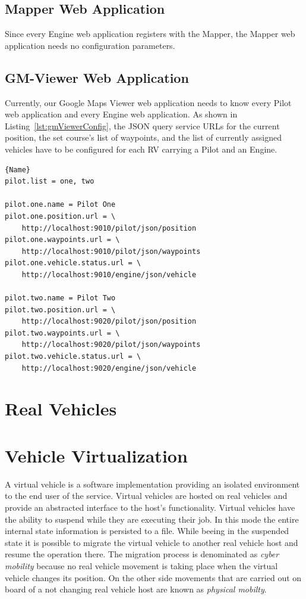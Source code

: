 \subsection{Mapper Web Application}
Since every Engine web application registers with the Mapper, the Mapper web application needs no
configuration parameters.



\subsection{GM-Viewer Web Application}
Currently, our Google Maps Viewer web application needs to know every Pilot web application
and every Engine web application. As shown in Listing~\ref{lst:gmViewerConfig}, the \acs{JSON} \cite{RFC_4627}
query service \acsp{URL} for the current position, the set course's list of waypoints, and the  
list of currently assigned vehicles have to be configured for each \ac{RV} carrying a Pilot and an Engine.   

\lstset{tabsize=3,language=Tex}
\begin{lstlisting}[caption={Google Maps Viewer Configuration Example},mathescape=true,label=lst:gmViewerConfig]{Name}
pilot.list = one, two

pilot.one.name = Pilot One
pilot.one.position.url = \
	http://localhost:9010/pilot/json/position
pilot.one.waypoints.url = \
	http://localhost:9010/pilot/json/waypoints
pilot.one.vehicle.status.url = \
	http://localhost:9010/engine/json/vehicle

pilot.two.name = Pilot Two
pilot.two.position.url = \
	http://localhost:9020/pilot/json/position
pilot.two.waypoints.url = \
	http://localhost:9020/pilot/json/waypoints
pilot.two.vehicle.status.url = \
	http://localhost:9020/engine/json/vehicle
\end{lstlisting}



\section{Real Vehicles}


\section{Vehicle Virtualization}

A virtual vehicle is a software implementation providing an isolated environment to the end user of the service. Virtual vehicles are hosted on real vehicles and provide an abstracted interface to the host's functionality. Virtual vehicles have the ability to suspend while they are executing their job. In this mode the entire internal state information is persisted to a file. While beeing in the suspended state it is possible to migrate the virtual vehicle to another real vehicle host and resume the operation there. The migration process is denominated as \emph{cyber mobility} because no real vehicle movement is taking place when the virtual vehicle changes its position. On the other side movements that are carried out on board of a not changing real vehicle host are known as \emph{physical mobilty}.

